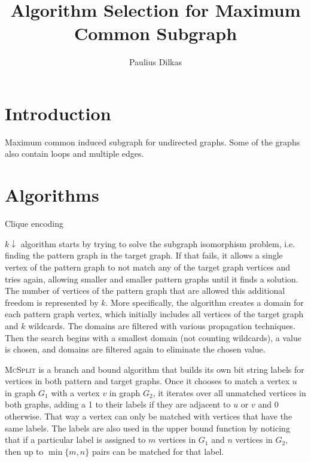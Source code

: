 \documentclass{article}
\author{Paulius Dilkas}
\title{Algorithm Selection for Maximum Common Subgraph}
\theoremstyle{definition}
\begin{document}
\maketitle

\section{Introduction}
Maximum common induced subgraph for undirected graphs. Some of the graphs also
contain loops and multiple edges.

\section{Algorithms}
Clique encoding \cite{DBLP:conf/cp/McCreeshNPS16}

$k\downarrow$ algorithm \cite{DBLP:conf/aaai/HoffmannMR17} starts by trying to
solve the subgraph isomorphism problem, i.e. finding the pattern graph in the
target graph. If that fails, it allows a single vertex of the pattern graph to
not match any of the target graph vertices and tries again, allowing smaller and
smaller pattern graphs until it finds a solution. The number of vertices of the
pattern graph that are allowed this additional freedom is represented by $k$.
More specifically, the algorithm creates a domain for each pattern graph vertex,
which initially includes all vertices of the target graph and $k$ wildcards. The
domains are filtered with various propagation techniques. Then the search begins
with a smallest domain (not counting wildcards), a value is chosen, and domains
are filtered again to eliminate the chosen value.

\textsc{McSplit} \cite{DBLP:conf/ijcai/McCreeshPT17} is a branch and bound
algorithm that builds its own bit string labels for vertices in both pattern and
target graphs. Once it chooses to match a vertex $u$ in graph $G_1$ with a
vertex $v$ in graph $G_2$, it iterates over all unmatched vertices in both
graphs, adding a 1 to their labels if they are adjacent to $u$ or $v$ and 0
otherwise. That way a vertex can only be matched with vertices that have the
same labels. The labels are also used in the upper bound function by noticing
that if a particular label is assigned to $m$ vertices in $G_1$ and $n$
vertices in $G_2$, then up to $\min \{ m, n \}$ pairs can be matched for that
label.
\end{document}
